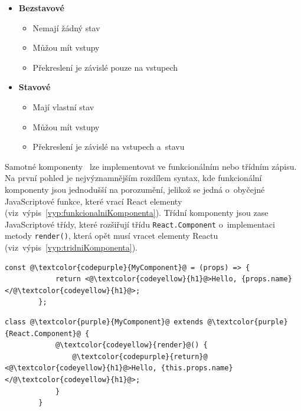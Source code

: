 \begin{itemize}
    \item \textbf{Bezstavové}
        \begin{itemize}
            \item Nemají žádný stav
            \item Můžou mít vstupy
            \item Překreslení je závislé pouze na vstupech
        \end{itemize}
    \item \textbf{Stavové}
        \begin{itemize}
            \item Mají vlastní stav
            \item Můžou mít vstupy
            \item Překreslení je závislé na vstupech a~stavu
        \end{itemize}
\end{itemize}

Samotné komponenty~\cite{website:ReactComponents} lze implementovat ve funkcionálním nebo třídním zápisu. Na první pohled je nejvýznamnějším rozdílem syntax, kde funkcionální komponenty jsou jednodušší na porozumění, jelikož se jedná o~obyčejné JavaScriptové funkce, které vrací React elementy (viz~výpis~\ref{vyp:funkcionalniKomponenta}). Třídní komponenty jsou zase JavaScriptové třídy, které rozšiřují třídu \texttt{React.Component} o~implementaci metody \texttt{render()}, která opět musí vracet elementy Reactu (viz~výpis~\ref{vyp:tridniKomponenta}).

\begin{center}
    \begin{lstlisting}[escapechar=@, label={vyp:funkcionalniKomponenta}, caption={Funkcionální komponenta definovaná pomocí šipkové notace.}]
        const @\textcolor{codepurple}{MyComponent}@ = (props) => {
            return <@\textcolor{codeyellow}{h1}@>Hello, {props.name}</@\textcolor{codeyellow}{h1}@>;
        };
    \end{lstlisting}
\end{center}

\begin{center}
    \begin{lstlisting}[escapechar=@, label={vyp:tridniKomponenta}, caption={Ekvivalentní definice výpisu~\ref{vyp:funkcionalniKomponenta} v~třídní komponentě.}]
        class @\textcolor{purple}{MyComponent}@ extends @\textcolor{purple}{React.Component}@ {
            @\textcolor{codeyellow}{render}@() {
                @\textcolor{codepurple}{return}@ <@\textcolor{codeyellow}{h1}@>Hello, {this.props.name}</@\textcolor{codeyellow}{h1}@>;
            }
        }
    \end{lstlisting}
\end{center}

